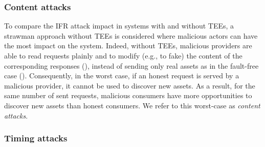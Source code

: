 \subsubsection{Content attacks} 

To compare the IFR attack impact in systems with and without TEEs, a strawman approach without TEEs is considered where malicious actors can have the most impact on the system. 
Indeed, without TEEs, malicious providers are able to read requests plainly and to modify (e.g., to fake) the content of the corresponding responses (), instead of sending only real assets as in the fault-free case (). 
Consequently, in the worst case, if an honest request is served by a malicious provider, it cannot be used to discover new assets.
As a result, for the same number of sent requests, malicious consumers have more opportunities to discover new assets than honest consumers.
We refer to this worst-case as \emph{content attacks}.


\subsubsection{Timing attacks}

